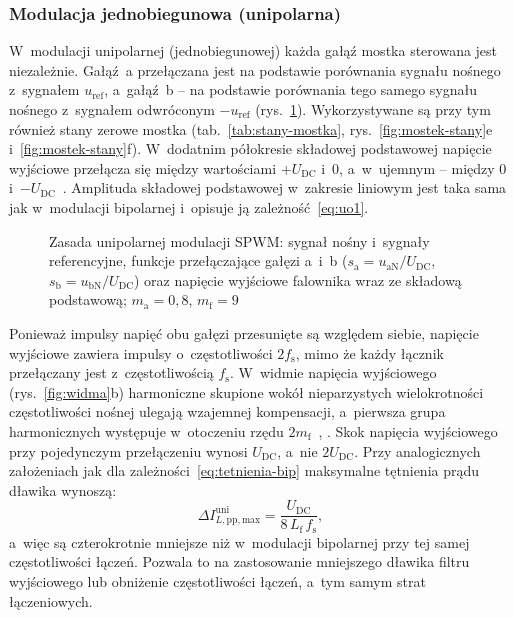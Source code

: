 \subsubsection*{Modulacja jednobiegunowa (unipolarna)}

W~modulacji unipolarnej (jednobiegunowej) każda gałąź mostka sterowana
jest niezależnie. Gałąź~a przełączana jest na podstawie porównania sygnału
nośnego z~sygnałem $u_\mathrm{ref}$, a~gałąź~b -- na podstawie porównania
tego samego sygnału nośnego z~sygnałem odwróconym $-u_\mathrm{ref}$
(rys.~\ref{fig:pwm-unipolarna}). Wykorzystywane są przy tym również stany
zerowe mostka (tab.~\ref{tab:stany-mostka},
rys.~\ref{fig:mostek-stany}e i~\ref{fig:mostek-stany}f). W~dodatnim półokresie składowej
podstawowej napięcie wyjściowe przełącza się między wartościami
$+U_\mathrm{DC}$ i~$0$, a~w~ujemnym -- między $0$ i~$-U_\mathrm{DC}$~\cite[s.~11--12]{instrukcja}.
Amplituda składowej podstawowej w~zakresie liniowym jest taka sama jak
w~modulacji bipolarnej i~opisuje ją zależność~\eqref{eq:uo1}.

\begin{figure}[htbp]
  \centering
  
  \caption{Zasada unipolarnej modulacji SPWM: sygnał nośny i~sygnały
    referencyjne, funkcje przełączające gałęzi a~i~b
    ($s_\mathrm{a} = u_\mathrm{aN}/U_\mathrm{DC}$,
    $s_\mathrm{b} = u_\mathrm{bN}/U_\mathrm{DC}$) oraz napięcie wyjściowe
    falownika wraz ze składową podstawową; $m_\mathrm{a} = 0{,}8$,
    $m_\mathrm{f} = 9$}
  \label{fig:pwm-unipolarna}
\end{figure}

Ponieważ impulsy napięć obu gałęzi przesunięte są względem siebie, napięcie
wyjściowe zawiera impulsy o~częstotliwości $2f_\mathrm{s}$, mimo że każdy
łącznik przełączany jest z~częstotliwością $f_\mathrm{s}$. W~widmie
napięcia wyjściowego (rys.~\ref{fig:widma}b) harmoniczne skupione wokół
nieparzystych wielokrotności częstotliwości nośnej ulegają wzajemnej
kompensacji, a~pierwsza grupa harmonicznych występuje w~otoczeniu rzędu
$2m_\mathrm{f}$~\cite[s.~12]{instrukcja}, \cite[podrozdz.~8-3-2-2]{mohan2003}. Skok napięcia wyjściowego przy
pojedynczym przełączeniu wynosi $U_\mathrm{DC}$, a~nie $2U_\mathrm{DC}$.
Przy analogicznych założeniach jak dla zależności~\eqref{eq:tetnienia-bip}
maksymalne tętnienia prądu dławika wynoszą:
\begin{equation}
  \Delta I_{L,\mathrm{pp,max}}^{\mathrm{uni}} = \frac{U_\mathrm{DC}}{8\, L_\mathrm{f}\, f_\mathrm{s}},
  \label{eq:tetnienia-uni}
\end{equation}
a~więc są czterokrotnie mniejsze niż w~modulacji bipolarnej przy tej samej
częstotliwości łączeń. Pozwala to na zastosowanie mniejszego dławika filtru
wyjściowego lub obniżenie częstotliwości łączeń, a~tym samym strat
łączeniowych.

